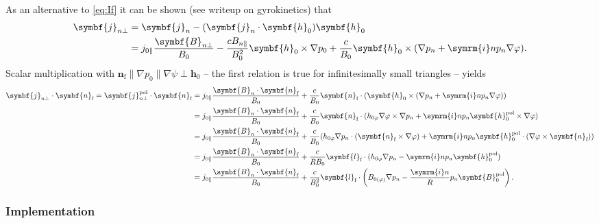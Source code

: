 \documentclass[a4paper, 10pt, english]{article}
\let\temp\vartheta
\let\vartheta\theta
\let\theta\temp
\let\temp\varphi
\let\varphi\phi
\let\phi\temp
\let\vec\symbf
\newcommand*\im{\ensuremath{\symrm{i}}}  %
\newcommand*\pol{\ensuremath{\textrm{pol}}}  %
\newcommand*\fs{\ensuremath{\textrm{f}}}  %
\begin{document}
As an alternative to \cref{eq:If} it can be shown (see writeup on gyrokinetics) that
\begin{align}
  \vec{j}_{n \perp} &= \vec{j}_{n} - (\vec{j}_{n} \cdot \vec{h}_{0}) \vec{h}_{0} \nonumber \\
  &= j_{0 \parallel} \frac{\vec{B}_{n \perp}}{B_{0}} - \frac{c B_{n \parallel}}{B_{0}^{2}} \vec{h}_{0} \times \nabla p_{0} + \frac{c}{B_{0}} \vec{h}_{0} \times (\nabla p_{n} + \im n p_{n} \nabla \phi).
\end{align}
Scalar multiplication with $\vec{n}_{\fs} \parallel \nabla p_{0} \parallel \nabla \psi \perp \vec{h}_{0}$ -- the first relation is true for infinitesimally small triangles -- yields
\begin{align}
  \vec{j}_{n \perp} \cdot \vec{n}_{\fs} = \vec{j}_{n \perp}^{\pol} \cdot \vec{n}_{\fs} &= j_{0 \parallel} \frac{\vec{B}_{n} \cdot \vec{n}_{\fs}}{B_{0}} + \frac{c}{B_{0}} \vec{n}_{\fs} \cdot (\vec{h}_{0} \times (\nabla p_{n} + \im n p_{n} \nabla \phi)) \nonumber \\
  &= j_{0 \parallel} \frac{\vec{B}_{n} \cdot \vec{n}_{\fs}}{B_{0}} + \frac{c}{B_{0}} \vec{n}_{\fs} \cdot (h_{0 \phi} \nabla \phi \times \nabla p_{n} + \im n p_{n} \vec{h}_{0}^{\pol} \times \nabla \phi) \nonumber \\
  &= j_{0 \parallel} \frac{\vec{B}_{n} \cdot \vec{n}_{\fs}}{B_{0}} + \frac{c}{B_{0}} (h_{0 \phi} \nabla p_{n} \cdot (\vec{n}_{\fs} \times \nabla \phi) + \im n p_{n} \vec{h}_{0}^{\pol} \cdot (\nabla \phi \times \vec{n}_{\fs})) \nonumber \\
  &= j_{0 \parallel} \frac{\vec{B}_{n} \cdot \vec{n}_{\fs}}{B_{0}} + \frac{c}{R B_{0}} \vec{l}_{\fs} \cdot (h_{0 \phi} \nabla p_{n} - \im n p_{n} \vec{h}_{0}^{\pol}) \nonumber \\
  &= j_{0 \parallel} \frac{\vec{B}_{n} \cdot \vec{n}_{\fs}}{B_{0}} + \frac{c}{B_{0}^{2}} \vec{l}_{\fs} \cdot \left( B_{0 (\phi)} \nabla p_{n} - \frac{\im n}{R} p_{n} \vec{B}_{0}^{\pol} \right). \label{eq:I3_alt}
\end{align}

\subsubsection{Implementation}
\end{document}
